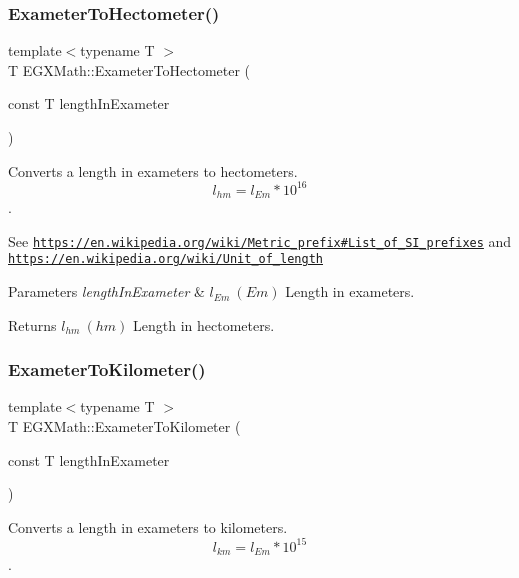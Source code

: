 \subsubsection{\texorpdfstring{Exameter\+To\+Hectometer()}{ExameterToHectometer()}}
{\footnotesize\ttfamily template$<$typename T $>$ \\
T E\+G\+X\+Math\+::\+Exameter\+To\+Hectometer (\begin{DoxyParamCaption}\item[{const T}]{length\+In\+Exameter }\end{DoxyParamCaption})}



Converts a length in exameters to hectometers. \[ l_{hm}=l_{Em} * 10^{16} \]. 

See \href{https://en.wikipedia.org/wiki/Metric_prefix#List_of_SI_prefixes}{\tt https\+://en.\+wikipedia.\+org/wiki/\+Metric\+\_\+prefix\#\+List\+\_\+of\+\_\+\+S\+I\+\_\+prefixes} and \href{https://en.wikipedia.org/wiki/Unit_of_length}{\tt https\+://en.\+wikipedia.\+org/wiki/\+Unit\+\_\+of\+\_\+length} 
\begin{DoxyParams}{Parameters}
{\em length\+In\+Exameter} & $ l_{Em}\ (Em)$ Length in exameters. \\
\hline
\end{DoxyParams}
\begin{DoxyReturn}{Returns}
$ l_{hm}\ (hm)$ Length in hectometers. 
\end{DoxyReturn}
\mbox{\label{group___e_g_x_math-_conversions-_length_conversions-_s_i-_exameter-_s_i_gad8c1732c3b4a07b330d5327c099bbd7c}} 
\subsubsection{\texorpdfstring{Exameter\+To\+Kilometer()}{ExameterToKilometer()}}
{\footnotesize\ttfamily template$<$typename T $>$ \\
T E\+G\+X\+Math\+::\+Exameter\+To\+Kilometer (\begin{DoxyParamCaption}\item[{const T}]{length\+In\+Exameter }\end{DoxyParamCaption})}



Converts a length in exameters to kilometers. \[ l_{km}=l_{Em} * 10^{15} \]. 

